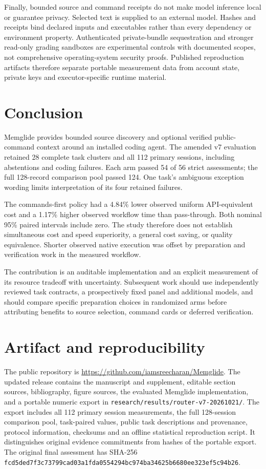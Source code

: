 \documentclass[manuscript,screen,nonacm]{acmart}
\begin{document}
Finally, bounded source and command receipts do not make model inference
local or guarantee privacy. Selected text is supplied to an external
model. Hashes and receipts bind declared inputs and executables rather
than every dependency or environment property. Authenticated
private-bundle sequestration and stronger read-only grading sandboxes
are experimental controls with documented scopes, not comprehensive
operating-system security proofs. Published reproduction artifacts
therefore separate portable measurement data from account state, private
keys and executor-specific runtime material.

\section{Conclusion}\label{conclusion}

Memglide provides bounded source discovery and optional verified
public-command context around an installed coding agent. The amended v7
evaluation retained 28 complete task clusters and all 112 primary
sessions, including abstentions and coding failures. Each arm passed 54
of 56 strict assessments; the full 128-record comparison pool passed
124. One task's ambiguous exception wording limits interpretation of its
four retained failures.

The commands-first policy had a 4.84\% lower observed uniform
API-equivalent cost and a 1.17\% higher observed workflow time than
pass-through. Both nominal 95\% paired intervals include zero. The study
therefore does not establish simultaneous cost and speed superiority, a
general cost saving, or quality equivalence. Shorter observed native
execution was offset by preparation and verification work in the
measured workflow.

The contribution is an auditable implementation and an explicit
measurement of its resource tradeoff with uncertainty. Subsequent work
should use independently reviewed task contracts, a prospectively fixed
panel and additional models, and should compare specific preparation
choices in randomized arms before attributing benefits to source
selection, command cards or deferred verification.

\section{Artifact and
reproducibility}\label{artifact-and-reproducibility}

The public repository is
\url{https://github.com/iamsreecharan/Memglide}. The updated release
contains the manuscript and supplement, editable section sources,
bibliography, figure sources, the evaluated Memglide implementation, and
a portable numeric export in
\nolinkurl{research/results/router-v7-20261021/}. The export includes
all 112 primary session measurements, the full 128-session comparison
pool, task-paired values, public task descriptions and provenance,
protocol information, checksums and an offline statistical reproduction
script. It distinguishes original evidence commitments from hashes of
the portable export. The original final assessment has SHA-256
\nolinkurl{fcd5ded7f3c73799cad03a1fda0554294bc974ba34625b6680ee323ef5c94b26}.
\end{document}
